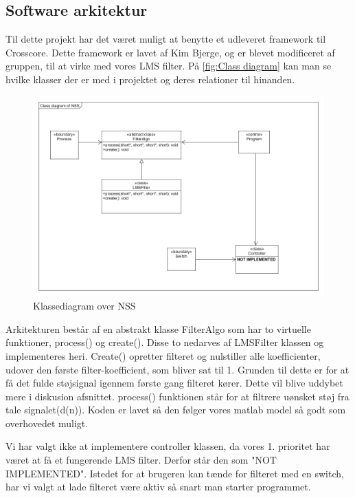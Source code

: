 \newpage

\subsection{Software arkitektur}
Til dette projekt har det været muligt at benytte et udleveret framework til Crosscore. Dette framework er lavet af Kim Bjerge, og er blevet modificeret af gruppen, til at virke med vores LMS filter. På \autoref{fig:Class diagram} kan man se hvilke klasser der er med i projektet og deres relationer til hinanden. 


\begin{figure}[H]
	\centering
	\includegraphics[width = 400pt]{Img/ClassDiagram.png}
	\caption{Klassediagram over NSS}
	\label{fig:Class diagram}
\end{figure}

Arkitekturen består af en abstrakt klasse FilterAlgo som har to virtuelle funktioner, process() og create(). Disse to nedarves af LMSFilter klassen og implementeres heri. Create() opretter filteret og nulstiller alle koefficienter, udover den første filter-koefficient, som bliver sat til 1. Grunden til dette er for at få det fulde støjsignal igennem første gang filteret kører. Dette vil blive uddybet mere i diskusion afsnittet. process() funktionen står for at filtrere uønsket støj fra tale signalet(d(n)). Koden er lavet så den følger vores matlab model så godt som overhovedet muligt. 

Vi har valgt ikke at implementere controller klassen, da vores 1. prioritet har været at få et fungerende LMS filter. Derfor står den som "NOT IMPLEMENTED". Istedet for at brugeren kan tænde for filteret med en switch, har vi valgt at lade filteret være aktiv så snart man starter programmet. 



